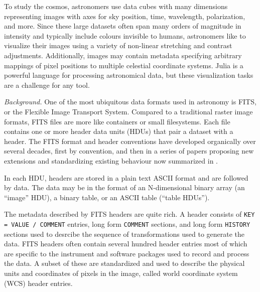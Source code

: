 \documentclass{juliacon}
\begin{document}


\maketitle

To study the cosmos, astronomers use data cubes with many dimensions representing images with axes for sky position, time, wavelength, polarization, and more. Since these large datasets often span many orders of magnitude in intensity and typically include colours invisible to humans, astronomers like to visualize their images using a variety of non-linear stretching and contrast adjustments.
Additionally, images may contain metadata specifying arbitrary mappings of pixel positions to multiple celestial coordinate systems.
Julia\cite{bezanson2017julia} is a powerful language for processing astronomical data, but these visualization tasks are a challenge for any tool.

\vspace{0.2cm}
\emph{Background.}
One of the most ubiquitous data formats used in astronomy is FITS, or the Flexible Image Transport System.
Compared to a traditional raster image formats, FITS files are more like containers or small filesystems.
Each file contains one or more header data units (HDUs) that pair a dataset with a header.
The FITS format and header conventions have developed organically over several decades, first by convention,
and then in a series of papers proposing new extensions and standardizing existing behaviour now summarized in \cite{fitsstandard}.

In each HDU,
headers are stored in a plain text ASCII format and are followed by data.
The data may be in the format of an N-dimensional binary array (an ``image'' HDU),
a binary table,
or an ASCII table (``table HDUs'').

The metadata described by FITS headers are quite rich.
A header consists of \verb|KEY = VALUE / COMMENT| entries, long form \verb|COMMENT| sections,
and long form \verb|HISTORY| sections used to desrcibe the sequence of transformations used to generate the data.
FITS headers often contain several hundred header entries most of which are specific to the instrument and software packages used to record and process the data.
A subset of these are standardized and used to describe the physical units and coordinates of pixels in the image, called world coordinate system (WCS) header entries.
\end{document}
